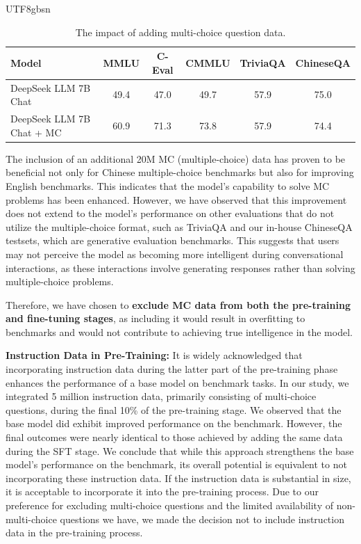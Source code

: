 \documentclass[11pt, a4paper, logo, copyright, nonumbering]{deepseek}
\begin{document}
\begin{CJK*}{UTF8}{gbsn}
\begin{table}[h]
\centering  \small
\begin{tabular}{lccccc}
	\toprule
Model & MMLU & C-Eval & CMMLU  & TriviaQA & ChineseQA \\ \midrule
DeepSeek LLM 7B Chat & 49.4 & 47.0 & 49.7 & 57.9 & 75.0 \\ 
DeepSeek LLM 7B Chat + MC & 60.9 & 71.3 & 73.8 & 57.9 & 74.4 \\ 	\bottomrule
\end{tabular}
\caption{\centering The impact of adding multi-choice question data.}
\label{table:mc}
\end{table}

The inclusion of an additional 20M MC (multiple-choice) data has proven to be beneficial not only for Chinese multiple-choice benchmarks but also for improving English benchmarks. This indicates that the model's capability to solve MC problems has been enhanced. However, we have observed that this improvement does not extend to the model's performance on other evaluations that do not utilize the multiple-choice format, such as TriviaQA and our in-house ChineseQA testsets, which are generative evaluation benchmarks. This suggests that users may not perceive the model as becoming more intelligent during conversational interactions, as these interactions involve generating responses rather than solving multiple-choice problems.

Therefore, we have chosen to \textbf{exclude MC data from both the pre-training and fine-tuning stages}, as including it would result in overfitting to benchmarks and would not contribute to achieving true intelligence in the model.


\textbf{Instruction Data in Pre-Training:} It is widely acknowledged that incorporating instruction data during the latter part of the pre-training phase enhances the performance of a base model on benchmark tasks. In our study, we integrated 5 million instruction data, primarily consisting of multi-choice questions, during the final 10\% of the pre-training stage. We observed that the base model did exhibit improved performance on the benchmark. However, the final outcomes were nearly identical to those achieved by adding the same data during the SFT stage. We conclude that while this approach strengthens the base model's performance on the benchmark, its overall potential is equivalent to not incorporating these instruction data. If the instruction data is substantial in size, it is acceptable to incorporate it into the pre-training process. Due to our preference for excluding multi-choice questions and the limited availability of non-multi-choice questions we have, we made the decision not to include instruction data in the pre-training process. 


\end{CJK*}
\end{document}
